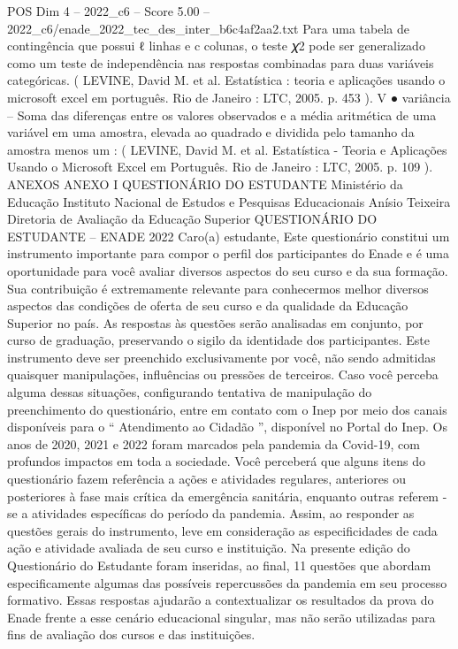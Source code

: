 \begin{textsample}{POS Dim 4 – 2022\_c6 – Score 5.00 – 2022\_c6/enade\_2022\_tec\_des\_inter\_b6c4af2aa2.txt}
Para uma tabela de contingência que possui ℓ linhas e c colunas, o teste 𝜒2 pode ser generalizado como um teste de independência nas respostas combinadas para duas variáveis categóricas. ( LEVINE, David M. et al.
Estatística : teoria e aplicações usando o microsoft excel em português.
Rio de Janeiro : LTC, 2005. p. 453 ).
V {\EmojiFont ●} variância – Soma das diferenças entre os valores observados e a média aritmética de uma variável em uma amostra, elevada ao quadrado e dividida pelo tamanho da amostra menos um : ( LEVINE, David M. et al.
Estatística - Teoria e Aplicações Usando o Microsoft Excel em Português.
Rio de Janeiro : LTC, 2005. p. 109 ).
ANEXOS ANEXO I QUESTIONÁRIO DO ESTUDANTE Ministério da Educação Instituto Nacional de Estudos e Pesquisas Educacionais Anísio Teixeira Diretoria de Avaliação da Educação Superior QUESTIONÁRIO DO ESTUDANTE – ENADE 2022 Caro(a) estudante, Este questionário constitui um instrumento importante para compor o perfil dos participantes do Enade e é uma oportunidade para você avaliar diversos aspectos do seu curso e da sua formação.
Sua contribuição é extremamente relevante para conhecermos melhor diversos aspectos das condições de oferta de seu curso e da qualidade da Educação Superior no país.
As respostas às questões serão analisadas em conjunto, por curso de graduação, preservando o sigilo da identidade dos participantes.
Este instrumento deve ser preenchido exclusivamente por você, não sendo admitidas quaisquer manipulações, influências ou pressões de terceiros.
Caso você perceba alguma dessas situações, configurando tentativa de manipulação do preenchimento do questionário, entre em contato com o Inep por meio dos canais disponíveis para o “ Atendimento ao Cidadão ”, disponível no Portal do Inep.
Os anos de 2020, 2021 e 2022 foram marcados pela pandemia da Covid-19, com profundos impactos em toda a sociedade.
Você perceberá que alguns itens do questionário fazem referência a ações e atividades regulares, anteriores ou posteriores à fase mais crítica da emergência sanitária, enquanto outras referem -se a atividades específicas do período da pandemia.
Assim, ao responder as questões gerais do instrumento, leve em consideração as especificidades de cada ação e atividade avaliada de seu curso e instituição.
Na presente edição do Questionário do Estudante foram inseridas, ao final, 11 questões que abordam especificamente algumas das possíveis repercussões da pandemia em seu processo formativo.
Essas respostas ajudarão a contextualizar os resultados da prova do Enade frente a esse cenário educacional singular, mas não serão utilizadas para fins de avaliação dos cursos e das instituições.

\end{textsample}
